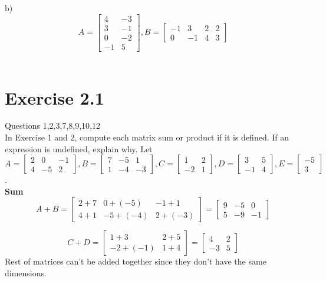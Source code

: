 \documentclass[a4paper]{article}
\begin{document}
b) \[A=
\begin{bmatrix}
4&-3\\
3&-1\\
0&-2\\
-1&5
\end{bmatrix},
B=
\begin{bmatrix}
-1&3&2&2\\
0&-1&4&3
\end{bmatrix}
\]\\

\section{Exercise 2.1}
Questions 1,2,3,7,8,9,10,12\\

In Exercise 1 and 2, compute each matrix sum or product if it is defined. If an expression is undefined, explain why. Let
$A=
\begin{bmatrix}
2&0&-1\\
4&-5&2
\end{bmatrix},
B=
\begin{bmatrix}
7&-5&1\\
1&-4&-3
\end{bmatrix},
C=
\begin{bmatrix}
1&2\\
-2&1
\end{bmatrix},
D=
\begin{bmatrix}
3&5\\
-1&4
\end{bmatrix},
E=
\begin{bmatrix}
-5\\
3
\end{bmatrix}
$.\\

\textbf{Sum}\\
\[A+B =
\begin{bmatrix}
2+7&0+(-5)&-1+1\\
4+1&-5+(-4)&2+(-3)
\end{bmatrix}=
\begin{bmatrix}
9&-5&0\\
5&-9&-1
\end{bmatrix}
\]

\[C+D =
\begin{bmatrix}
1+3&2+5\\
-2+(-1)&1+4
\end{bmatrix}=
\begin{bmatrix}
4&2\\
-3&5
\end{bmatrix}
\]
Rest of matrices can't be added together since they don't have the same dimensions.\\
\end{document}
